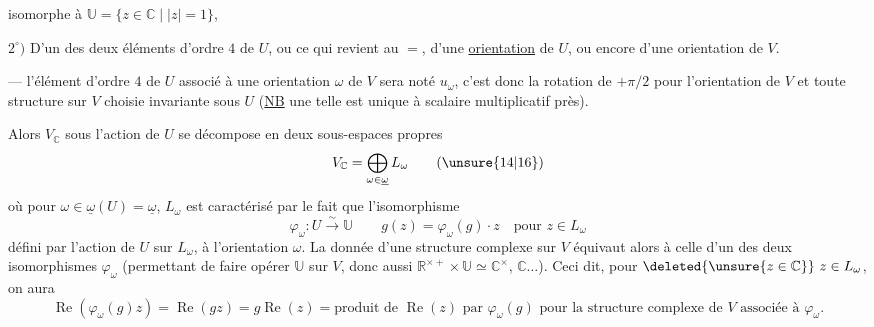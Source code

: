  isomorphe à $\mathbb U=\{z\in\mathbb C\mid |z|=1\}$, 

$2^\circ)$ D'un des deux éléments d'ordre $4$ de $U$, ou ce qui revient au $=$, d'une \uline{orientation} de $U$, ou encore  d'une orientation de $V$.

--- l'élément d'ordre $4$ de $U$ associé à une orientation $\omega$ de  $V$\inserted{)} sera noté $u_\omega$, c'est donc la rotation de $+\pi/2$ pour l'orientation \inserted{$\omega$} de $V$ et toute structure  sur $V$ choisie invariante sous $U$ (\uline{NB}  une telle  est unique à scalaire multiplicatif près).

Alors $V_{\mathbb C}$ sous l'action de $U$ se décompose en deux sous-espaces propres
\begin{equation}
V_{\mathbb C}=\bigoplus_{\omega\in\underline\omega}L_\omega
\tag{\unsure{14|16}}
\end{equation}
où pour $\omega\in\underline\omega(U)=\underline\omega$, $L_\omega$ est caractérisé par le fait que l'isomorphisme
\begin{equation}
\varphi_\omega:U\xrightarrow{\sim}\mathbb U
\qquad
g(z)=\varphi_\omega(g)\cdot z\quad\text{pour }z\in L_\omega
\tag{15}
\end{equation}
défini par l'action de $U$ sur $L_\omega$,  à l'orientation $\omega$. La donnée d'une structure complexe sur $V$  équivaut alors à celle d'un des deux isomorphismes $\varphi_\omega$ (permettant de faire opérer $\mathbb U$ sur $V$, donc aussi $\mathbb R^{\times+}\times\mathbb U\simeq\mathbb C^\times$,  $\mathbb C\ldots$). Ceci dit, pour $\deleted{\unsure{z\in\mathbb C}}\ z\in L_\omega$, on aura
\[
\operatorname{Re}(\varphi_\omega(g)z)=\operatorname{Re}(gz)=g\operatorname{Re}(z)
=\text{produit de }\operatorname{Re}(z)\text{ par }\varphi_\omega(g)
\text{ pour la structure complexe de }V\text{ associée à }\varphi_\omega.
\]
